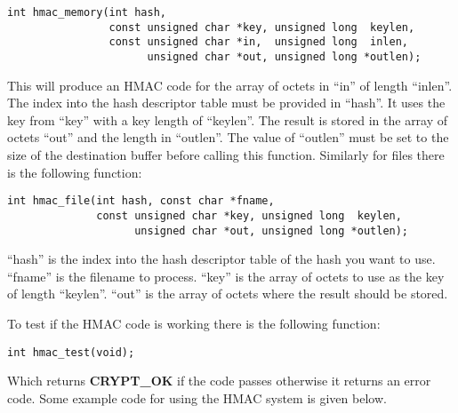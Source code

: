 \documentclass[a4paper]{book}
\begin{document}
\begin{verbatim}
int hmac_memory(int hash, 
                const unsigned char *key, unsigned long  keylen,
                const unsigned char *in,  unsigned long  inlen, 
                      unsigned char *out, unsigned long *outlen);
\end{verbatim}
This will produce an HMAC code for the array of octets in ``in'' of length ``inlen''.  The index into the hash descriptor 
table must be provided in ``hash''.  It uses the key from ``key'' with a key length of ``keylen''.  
The result is stored in the array of octets ``out'' and the length in ``outlen''.  The value of ``outlen'' must be set
to the size of the destination buffer before calling this function.  Similarly for files there is the  following function:
\begin{verbatim}
int hmac_file(int hash, const char *fname, 
              const unsigned char *key, unsigned long  keylen, 
                    unsigned char *out, unsigned long *outlen);
\end{verbatim}
``hash'' is the index into the hash descriptor table of the hash you want to use.  ``fname'' is the filename to process.  
``key'' is the array of octets to use as the key of length ``keylen''.  ``out'' is the array of octets where the 
result should be stored.

To test if the HMAC code is working there is the following function:
\begin{verbatim}
int hmac_test(void);
\end{verbatim}
Which returns {\bf CRYPT\_OK} if the code passes otherwise it returns an error code.  Some example code for using the 
HMAC system is given below.
\end{document}
